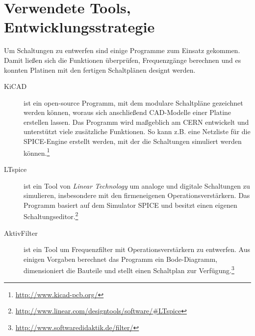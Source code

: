 \section{Verwendete Tools, Entwicklungsstrategie} %
Um Schaltungen zu entwerfen sind einige Programme zum Einsatz gekommen. Damit ließen sich die Funktionen überprüfen, Frequenzgänge berechnen und es konnten Platinen mit den fertigen Schaltplänen designt werden.
\begin{description}
	\item[KiCAD] ist ein open-source Programm, mit dem modulare Schaltpläne gezeichnet werden können, woraus sich anschließend CAD-Modelle einer Platine erstellen lassen. Das Programm wird maßgeblich am CERN entwickelt und unterstützt viele zusätzliche Funktionen. So kann z.B. eine Netzliste für die \ac{SPICE}-Engine erstellt werden, mit der die Schaltungen simuliert werden können.\footnote{\url{http://www.kicad-pcb.org/}}
	\item[LTspice] ist ein Tool von \textit{Linear Technology} um analoge und digitale Schaltungen zu simulieren, insbesondere mit den firmeneigenen Operationsverstärkern. Das Programm basiert auf dem Simulator \ac{SPICE} und besitzt einen eigenen Schaltungseditor.\footnote{\url{http://www.linear.com/designtools/software/\#LTspice}}
	\item[AktivFilter] ist ein Tool um Frequenzfilter mit Operationsverstärkern zu entwerfen. Aus einigen Vorgaben berechnet das Programm ein Bode-Diagramm, dimensioniert die Bauteile und stellt einen Schaltplan zur Verfügung.\footnote{\url{http://www.softwaredidaktik.de/filter/}}
\end{description}


